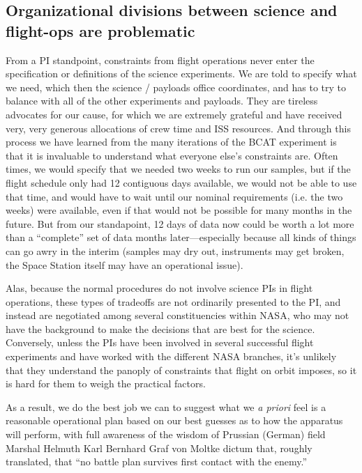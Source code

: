 \subsection{Organizational divisions between science and flight-ops are problematic}\hypertarget{organizational-divisions-between-science-and-flight-ops-are-problematic}{}\label{organizational-divisions-between-science-and-flight-ops-are-problematic}
From a PI standpoint, constraints from flight operations never enter the
specification or definitions of the science experiments. We are told to specify
what we need, which then the science / payloads office coordinates, and has to
try to balance with all of the other experiments and payloads. They are tireless
advocates for our cause, for which we are extremely grateful and have received
very, very generous allocations of crew time and ISS resources. And through this
process we have learned from the many iterations of the BCAT experiment is that
it is invaluable to understand what everyone else's constraints are. Often
times, we would specify that we needed two weeks to run our samples, but if the
flight schedule only had 12 contiguous days available, we would not be able to
use that time, and would have to wait until our nominal requirements (i.e. the
two weeks) were available, even if that would not be possible for many months in
the future. But from our standapoint, 12 days of data now could be worth a lot
more than a ``complete'' set of data months later---especially because all kinds
of things can go awry in the interim (samples may dry out, instruments may get
broken, the Space Station itself may have an operational issue).

Alas, because the normal procedures do not involve science PIs in flight
operations, these types of tradeoffs are not ordinarily presented to the PI, and
instead are negotiated among several constituencies within NASA, who may not
have the background to make the decisions that are best for the science.
Conversely, unless the PIs have been involved in several successful flight
experiments and have worked with the different NASA branches, it's unlikely that
they understand the panoply of constraints that flight on orbit imposes, so it
is hard for them to weigh the practical factors.

As a result, we do the best job we can to suggest what we \emph{a priori} feel
is a reasonable operational plan based on our best guesses as to how the
apparatus will perform, with full awareness of the wisdom of Prussian (German)
field Marshal Helmuth Karl Bernhard Graf von Moltke dictum that, roughly
translated, that ``no battle plan survives first contact with the enemy.''


